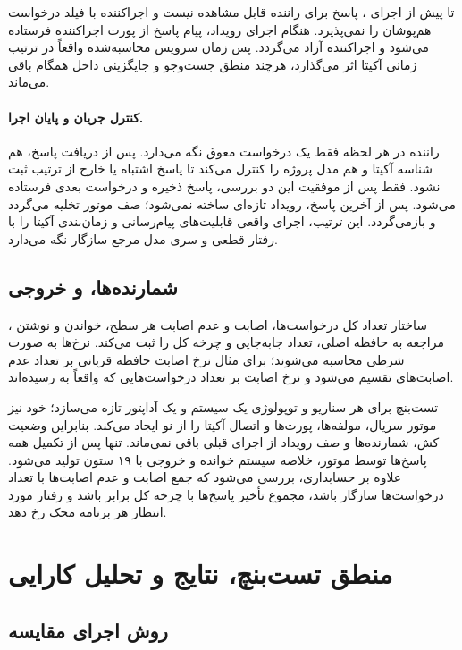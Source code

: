 \documentclass[oneside,a4paper,12pt]{article}
\newcommand{\مهم}[1]{\textbf{#1}}
\newcommand{\درصد}[1]{\lr{#1\%}}
\begin{document}
تا پیش از اجرای ، پاسخ برای راننده قابل مشاهده نیست و اجراکننده با فیلد  درخواست هم‌پوشان را نمی‌پذیرد. هنگام اجرای رویداد، پیام پاسخ از پورت اجراکننده فرستاده می‌شود و اجراکننده آزاد می‌گردد. پس زمان سرویس محاسبه‌شده واقعاً در ترتیب زمانی آکیتا اثر می‌گذارد، هرچند منطق جست‌وجو و جایگزینی داخل  همگام باقی می‌ماند.

\paragraph{کنترل جریان و پایان اجرا.}
راننده در هر لحظه فقط یک درخواست معوق نگه می‌دارد. پس از دریافت پاسخ، هم شناسه  آکیتا و هم  مدل پروژه را کنترل می‌کند تا پاسخ اشتباه یا خارج از ترتیب ثبت نشود. فقط پس از موفقیت این دو بررسی، پاسخ ذخیره و درخواست بعدی فرستاده می‌شود. پس از آخرین پاسخ، رویداد تازه‌ای ساخته نمی‌شود؛ صف موتور تخلیه می‌گردد و  بازمی‌گردد. این ترتیب، اجرای واقعی قابلیت‌های پیام‌رسانی و زمان‌بندی آکیتا را با رفتار قطعی و سری مدل مرجع سازگار نگه می‌دارد.

\subsection{شمارنده‌ها،  و خروجی }

ساختار  تعداد کل درخواست‌ها، اصابت و عدم اصابت هر سطح، خواندن و نوشتن ، مراجعه به حافظه اصلی، تعداد جابه‌جایی و چرخه کل را ثبت می‌کند. نرخ‌ها به صورت شرطی محاسبه می‌شوند؛ برای مثال نرخ اصابت حافظه قربانی بر تعداد عدم اصابت‌های  تقسیم می‌شود و نرخ اصابت  بر تعداد درخواست‌هایی که واقعاً به  رسیده‌اند.

تست‌بنچ برای هر سناریو و توپولوژی یک سیستم و یک آداپتور تازه می‌سازد؛ خود  نیز موتور سریال، مولفه‌ها، پورت‌ها و اتصال آکیتا را از نو ایجاد می‌کند. بنابراین وضعیت کش، شمارنده‌ها و صف رویداد از اجرای قبلی باقی نمی‌ماند. تنها پس از تکمیل همه پاسخ‌ها توسط موتور، خلاصه سیستم خوانده و خروجی  با ۱۹ ستون تولید می‌شود. علاوه بر حسابداری، بررسی می‌شود که جمع اصابت و عدم اصابت‌ها با تعداد درخواست‌ها سازگار باشد، مجموع تأخیر پاسخ‌ها با چرخه کل برابر باشد و رفتار مورد انتظار هر برنامه محک رخ دهد.

\section{منطق تست‌بنچ، نتایج و تحلیل کارایی}

\subsection{روش اجرای مقایسه}
\end{document}
